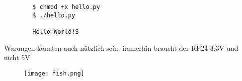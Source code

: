 \documentclass[12pt]{article}
\begin{document}
\begin{commandline}
	\begin{verbatim}
		$ chmod +x hello.py
		$ ./hello.py

		Hello World!S
	\end{verbatim}
\end{commandline}


\begin{warn}[Notice:]
  Warungen könnten auch nützlich sein, immerhin braucht der RF24 3.3V und nicht 5V
\end{warn}


\begin{figure}[h]
	\texttt{[image: fish.png]}
	\centering
\end{figure}






\end{document}
